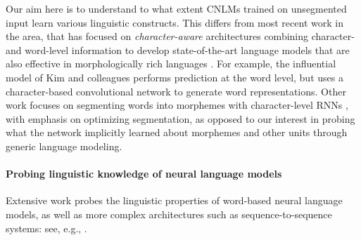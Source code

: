 Our aim here is to understand to what extent CNLMs trained on
unsegmented input learn various linguistic constructs. This differs
from most recent work in the area, that has focused on \emph{character-aware}
architectures combining character- and word-level information to
develop state-of-the-art language models that are also effective in
morphologically rich languages \citep[see, e.g.,][and references
there]{Bojanowski:etal:2016,Kim:etal:2016,Gerz:etal:2018}. For
example, the influential model of Kim and colleagues performs
prediction at the word level, but uses a character-based convolutional
network to generate word representations. Other work focuses on
segmenting words into morphemes with character-level RNNs
\cite[e.g.,][]{Kann:etal:2016}, with emphasis on optimizing segmentation, as
opposed to our interest in probing what the network implicitly learned
about morphemes and other units through generic language
modeling.%


\paragraph{Probing linguistic knowledge of neural language models}
Extensive work probes the linguistic properties of word-based neural
language models, as well as more complex architectures such as
sequence-to-sequence systems: see, e.g.,
.

